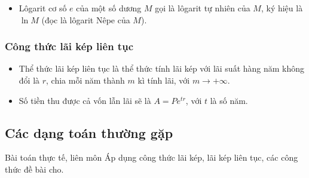 \begin{tomtat}
\begin{itemize}
\item Lôgarit cơ số $e$ của một số dương $M$ gọi là lôgarit tự nhiên của $M$, ký hiệu là $\ln M$ (đọc là lôgarit Nêpe của $M$).
\end{itemize}

\subsubsection{Công thức lãi kép liên tục}
\begin{itemize}
    \item Thể thức lãi kép liên tục là thể thức tính lãi kép với lãi suất hàng năm không đổi là $r$, chia mỗi năm thành $m$ kì tính lãi, với $m\to +\infty$.
    \item Số tiền thu được cả vốn lẫn lãi sẽ là $A=Pe^{tr}$, với $t$ là số năm.
\end{itemize}
\end{tomtat}
\subsection{Các dạng toán thường gặp}

\begin{dang}{Bài toán thực tế, liên môn}
	Áp dụng công thức lãi kép, lãi kép liên tục, các công thức đề bài cho.
\end{dang}
